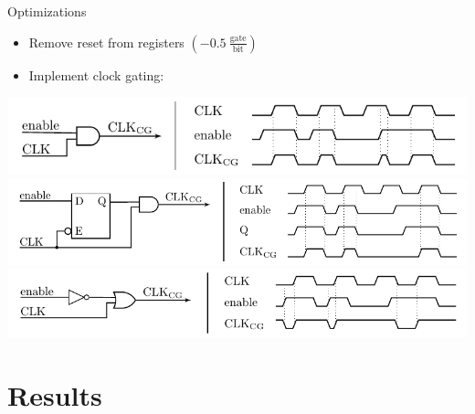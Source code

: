\documentclass[svgnames, handout,t]{beamer}
\newenvironment{changemargin}[2]{%
\begin{list}{}{%
\setlength{\topsep}{0pt}%
\setlength{\leftmargin}{#1}%
\setlength{\rightmargin}{#2}%
\setlength{\listparindent}{\parindent}%
\setlength{\itemindent}{\parindent}%
\setlength{\parsep}{\parskip}%
}%
\item[]}{\end{list}}
\begin{document}
\begin{frame}{Optimizations}
	\begin{itemize}
		\item Remove reset from registers $\left( -0.5 \: \frac{\text{gate}}{\text{bit}} \right)$
		\item Implement clock gating:
	\end{itemize}
	
	\begin{changemargin}{-2cm}{1.2cm}
		\raggedleft
			\includegraphics[height=0.13\paperheight]{images/cg-basic} \\[0.7em]
			\includegraphics[height=0.1747\paperheight]{images/cg-no-glitch} \\[0.7em]
			\includegraphics[height=0.13\paperheight]{images/cg-low-power}\\
	\end{changemargin}
\end{frame}

\section{Results}
\end{document}
